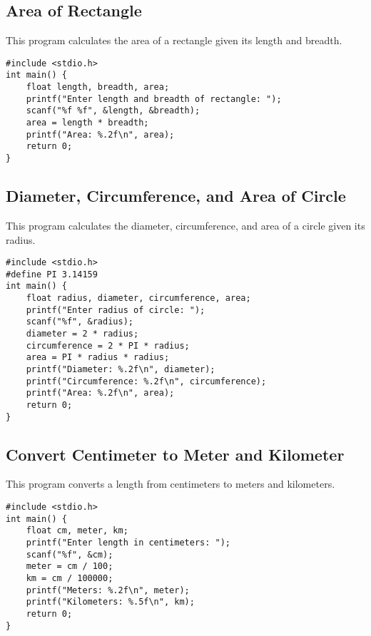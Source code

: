 \documentclass[a4paper,12pt]{article}
\begin{document}
\newpage

\subsection{Area of Rectangle}
This program calculates the area of a rectangle given its length and breadth.

\begin{lstlisting}[caption={Area of Rectangle}]
#include <stdio.h>
int main() {
    float length, breadth, area;
    printf("Enter length and breadth of rectangle: ");
    scanf("%f %f", &length, &breadth);
    area = length * breadth;
    printf("Area: %.2f\n", area);
    return 0;
}
\end{lstlisting}

\newpage

\subsection{Diameter, Circumference, and Area of Circle}
This program calculates the diameter, circumference, and area of a circle given its radius.

\begin{lstlisting}[caption={Diameter, Circumference, and Area of Circle}]
#include <stdio.h>
#define PI 3.14159
int main() {
    float radius, diameter, circumference, area;
    printf("Enter radius of circle: ");
    scanf("%f", &radius);
    diameter = 2 * radius;
    circumference = 2 * PI * radius;
    area = PI * radius * radius;
    printf("Diameter: %.2f\n", diameter);
    printf("Circumference: %.2f\n", circumference);
    printf("Area: %.2f\n", area);
    return 0;
}
\end{lstlisting}

\newpage

\subsection{Convert Centimeter to Meter and Kilometer}
This program converts a length from centimeters to meters and kilometers.

\begin{lstlisting}[caption={Convert Centimeter to Meter and Kilometer}]
#include <stdio.h>
int main() {
    float cm, meter, km;
    printf("Enter length in centimeters: ");
    scanf("%f", &cm);
    meter = cm / 100;
    km = cm / 100000;
    printf("Meters: %.2f\n", meter);
    printf("Kilometers: %.5f\n", km);
    return 0;
}
\end{lstlisting}
\end{document}
